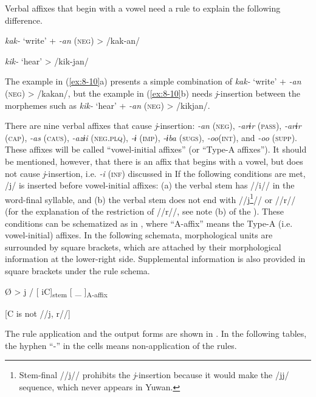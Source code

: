 Verbal affixes that begin with a vowel need a rule to explain the following difference.

\ea\label{ex:8-10}
\ea \textit{kak-}  ‘write’  +  \textit{-an} (\textsc{neg})  >  /kak-an/


\ex \textit{kik-}  ‘hear’        >  /kik-jan/
\z
\z

The example in (\ref{ex:8-10}a) presents a simple combination of \textit{kak-} ‘write’ + \textit{-an} (\textsc{neg}) > /kakan/, but the example in (\ref{ex:8-10}b) needs \textit{j}-insertion between the morphemes such as \textit{kik-} ‘hear’ + \textit{-an} (\textsc{neg}) > /kikjan/.

There are nine verbal affixes that cause \textit{j}-insertion: \textit{-an} (\textsc{neg}), \textit{-arɨr} (\textsc{pass}), \textit{-arɨr} (\textsc{cap}), \textit{-as} (\textsc{caus}), \textit{-azɨi} (\textsc{neg}.\textsc{plq}), \textit{-ɨ} (\textsc{imp}), \textit{-ɨba} (\textsc{sugs}), \textit{-oo}(\textsc{int}), and \textit{-oo} (\textsc{supp}). These affixes will be called “vowel-initial affixes” (or “Type-A affixes”). It should be mentioned, however, that there is an affix that begins with a vowel, but does not cause \textit{j}-insertion, i.e. \textit{-i} (\textsc{inf}) discussed in  If the following conditions are met, /j/ is inserted before vowel-initial affixes: (a) the verbal stem has //i// in the word-final syllable, and (b) the verbal stem does not end with //j\footnote{Stem-final //j// prohibits the \textit{j}-insertion because it would make the /jj/ sequence, which never appears in Yuwan.}// or //r// (for the explanation of the restriction of //r//, see note (b) of the ). These conditions can be schematized as in , where “A-affix” means the Type-A (i.e. vowel-initial) affixes. In the following schemata, morphological units are surrounded by square brackets, which are attached by their morphological information at the lower-right side. Supplemental information is also provided in square brackets under the rule schema.

\ea\label{ex:8-11}
  Ø  >  j  /  [   iC]\textsubscript{stem}  [ \_   ]\textsubscript{A-affix}

          [C is not //j, r//]  
\z

The rule application and the output forms are shown in . In the following tables, the hyphen “-” in the cells means non-application of the rules.

